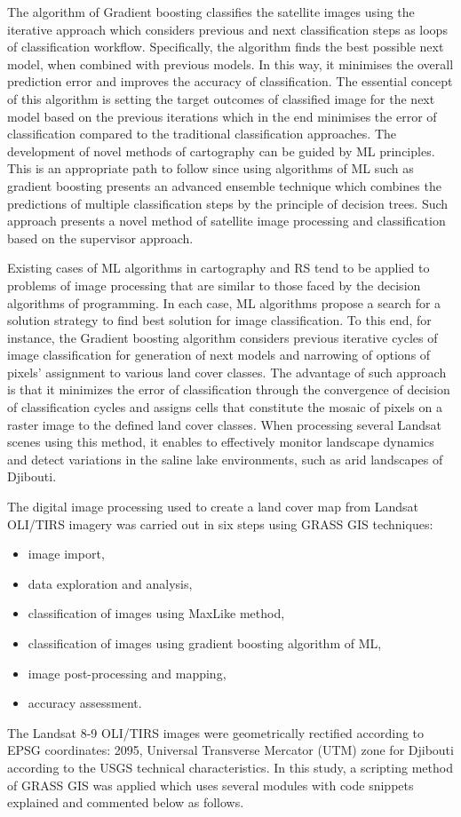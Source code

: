 \documentclass[jimaging,article,submit,pdftex,moreauthors]{Definitions/mdpi}
\begin{document}
The algorithm of Gradient boosting classifies the satellite images using the iterative approach which considers previous and next classification steps as loops of classification workflow. Specifically, the algorithm finds the best possible next model, when combined with previous models. In this way, it minimises the overall prediction error and improves the accuracy of classification. The essential concept of this algorithm is setting the target outcomes of classified image for the next model based on the previous iterations which in the end minimises the error of classification compared to the traditional classification approaches. The development of novel methods of cartography can be guided by ML principles. This is an appropriate path to follow since using algorithms of ML such as gradient boosting presents an advanced ensemble technique which combines the predictions of multiple classification steps by the principle of decision trees. Such approach presents a novel method of satellite image processing and classification based on the supervisor approach. 

Existing cases of ML algorithms in cartography and RS tend to be applied to problems of image processing that are similar to those faced by the decision algorithms of programming. In each case, ML algorithms propose a search for a solution strategy to find best solution for image classification. To this end, for instance, the Gradient boosting algorithm considers previous iterative cycles of image classification for generation of next models and narrowing of options of pixels' assignment to various land cover classes. The advantage of such approach is that it minimizes the error of classification through the convergence of decision of classification cycles and assigns cells that constitute the mosaic of pixels on a raster image to the defined land cover classes. When processing several Landsat scenes using this method, it enables to effectively monitor landscape dynamics and detect variations in the saline lake environments, such as arid landscapes of Djibouti. 

The digital image processing used to create a land cover map from Landsat OLI/TIRS imagery was carried out in six steps using GRASS GIS techniques: 
\begin{itemize}
	\item image import, 
	\item data exploration and analysis, 
	\item classification of images using MaxLike method, 
	\item classification of images using gradient boosting algorithm of ML, 
	\item image post-processing and mapping,  
	\item accuracy assessment. 
\end{itemize}
The Landsat 8-9 OLI/TIRS images were geometrically rectified according to EPSG coordinates: 2095, Universal Transverse Mercator (UTM) zone for Djibouti according to the USGS technical characteristics. In this study, a scripting method of GRASS GIS was applied which uses several modules with code snippets explained and commented below as follows. 
\end{document}
